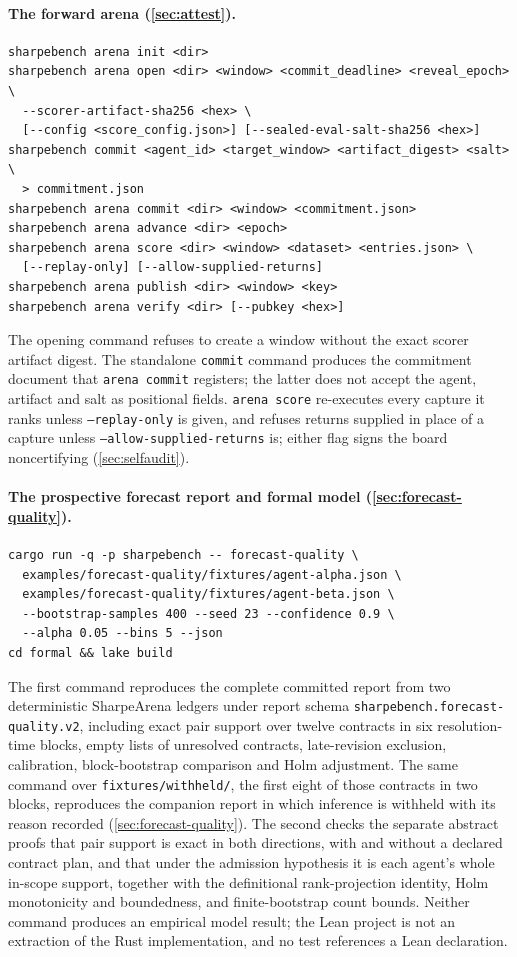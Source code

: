 \paragraph{The forward arena (\cref{sec:attest}).}
\begin{verbatim}
sharpebench arena init <dir>
sharpebench arena open <dir> <window> <commit_deadline> <reveal_epoch> \
  --scorer-artifact-sha256 <hex> \
  [--config <score_config.json>] [--sealed-eval-salt-sha256 <hex>]
sharpebench commit <agent_id> <target_window> <artifact_digest> <salt> \
  > commitment.json
sharpebench arena commit <dir> <window> <commitment.json>
sharpebench arena advance <dir> <epoch>
sharpebench arena score <dir> <window> <dataset> <entries.json> \
  [--replay-only] [--allow-supplied-returns]
sharpebench arena publish <dir> <window> <key>
sharpebench arena verify <dir> [--pubkey <hex>]
\end{verbatim}
The opening command refuses to create a window without the exact scorer artifact digest. The standalone \texttt{commit} command produces the commitment document that \texttt{arena commit} registers; the latter does not accept the agent, artifact and salt as positional fields. \texttt{arena score} re-executes every capture it ranks unless \texttt{--replay-only} is given, and refuses returns supplied in place of a capture unless \texttt{--allow-supplied-returns} is; either flag signs the board noncertifying (\cref{sec:selfaudit}).

\paragraph{The prospective forecast report and formal model (\cref{sec:forecast-quality}).}
\begin{verbatim}
cargo run -q -p sharpebench -- forecast-quality \
  examples/forecast-quality/fixtures/agent-alpha.json \
  examples/forecast-quality/fixtures/agent-beta.json \
  --bootstrap-samples 400 --seed 23 --confidence 0.9 \
  --alpha 0.05 --bins 5 --json
cd formal && lake build
\end{verbatim}
The first command reproduces the complete committed report from two deterministic SharpeArena \citep{toca2026sharpearena} ledgers under report schema \texttt{sharpebench.\allowbreak forecast-quality.\allowbreak v2}, including exact pair support over twelve contracts in six resolution-time blocks, empty lists of unresolved contracts, late-revision exclusion, calibration, block-bootstrap comparison and Holm adjustment. The same command over \texttt{fixtures/withheld/}, the first eight of those contracts in two blocks, reproduces the companion report in which inference is withheld with its reason recorded (\cref{sec:forecast-quality}). The second checks the separate abstract proofs that pair support is exact in both directions, with and without a declared contract plan, and that under the admission hypothesis it is each agent's whole in-scope support, together with the definitional rank-projection identity, Holm monotonicity and boundedness, and finite-bootstrap count bounds. Neither command produces an empirical model result; the Lean project is not an extraction of the Rust implementation, and no test references a Lean declaration.

